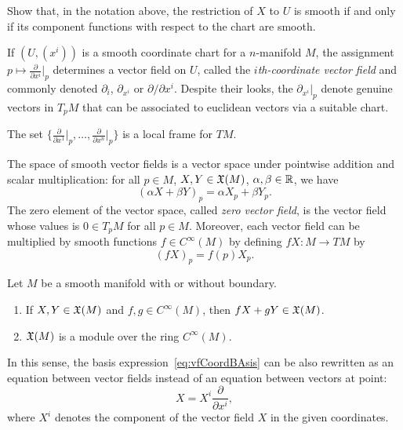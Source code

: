 \begin{exercise}[\textit{[homework 2]}]
  Show that, in the notation above, the restriction of $X$ to $U$ is smooth if and only if its component functions with respect to the chart are smooth.
\end{exercise}

\begin{example}
  If $(U, (x^i))$ is a smooth coordinate chart for a $n$-manifold $M$, the assignment $p \mapsto \frac{\partial}{\partial x^i}\big|_p$ determines a vector field on $U$, called the \emph{$i$th-coordinate vector field} and commonly denoted $\partial_{i}$, $\partial_{x^i}$ or $\partial/\partial x^i$.
  Despite their looks, the $\partial_{x^i}|_p$ denote genuine vectors in $T_p M$ that can be associated to euclidean vectors via a suitable chart.

  The set $\{\frac{\partial}{\partial x^1}\big|_p, \ldots, \frac{\partial}{\partial x^n}\big|_p\}$ is a local frame for $TM$.
\end{example}

The space of smooth vector fields is a vector space under pointwise addition and scalar multiplication: for all $p\in M$, $X,Y\in\mathfrak{X}(M)$, $\alpha, \beta \in \mathbb{R}$, we have
\begin{equation}
  (\alpha X + \beta Y)_p = \alpha X_p + \beta Y_p.
\end{equation}
The zero element of the vector space, called \emph{zero vector field}, is the vector field whose values is $0\in T_pM$ for all $p\in M$.
Moreover, each vector field can be multiplied by smooth functions $f\in C^\infty(M)$ by defining $fX:M\to  TM$ by
\begin{equation}
  (fX)_p = f(p)X_p.
\end{equation}

\begin{proposition}
  Let $M$ be a smooth manifold with or without boundary.
  \begin{enumerate}
    \item If $X,Y \in \mathfrak{X}(M)$ and $f,g\in C^\infty(M)$, then $fX+gY \in\mathfrak{X}(M)$.
    \item $\mathfrak{X}(M)$ is a module over the ring $C^\infty(M)$.
  \end{enumerate}
\end{proposition}

In this sense, the basis expression~\eqref{eq:vfCoordBAsis} can be also rewritten as an equation between vector fields instead of an equation between vectors at point:
\begin{equation}\label{eq:vfCoordBAsis}
  X = X^i \frac{\partial}{\partial x^i},
\end{equation}
where $X^i$ denotes the component of the vector field $X$ in the given coordinates.

